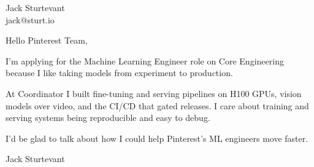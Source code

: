 \documentclass[11pt]{article}
\begin{document}
\raggedright

{\namefont\fontsize{20pt}{24pt}\selectfont Jack Sturtevant}\\[-0.3em]
jack@sturt.io

\vspace{1.2em}

Hello Pinterest Team,

I'm applying for the Machine Learning Engineer role on Core Engineering because I like taking models from experiment to production.

At Coordinator I built fine-tuning and serving pipelines on H100 GPUs, vision models over video, and the CI/CD that gated releases. I care about training and serving systems being reproducible and easy to debug.

I'd be glad to talk about how I could help Pinterest's ML engineers move faster.

\vspace{0.6em}
Jack Sturtevant
\end{document}
